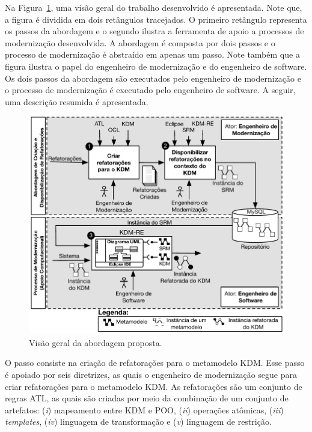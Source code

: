

Na Figura~\ref{fig:abordagem_kdm_tese_processo}, uma visão geral do trabalho desenvolvido é apresentada. Note que, a figura é dividida em dois retângulos tracejados. O primeiro retângulo representa os passos da abordagem e o segundo ilustra a ferramenta de apoio a processos de modernização desenvolvida. A abordagem é composta por dois passos e o processo de modernização é abstraído em apenas um passo. Note também que a figura ilustra o papel do engenheiro de modernização e do engenheiro de software. 
Os dois passos da abordagem são executados pelo engenheiro de modernização e o processo de modernização é executado pelo engenheiro de software. A seguir, uma descrição resumida é apresentada.

\begin{figure}[h]
	\centering
	\caption{Visão geral da abordagem proposta.}
	\label{fig:abordagem_kdm_tese_processo}
	\includegraphics[scale=0.8]{images/NovaFiguraSintexeAbordagem}
	\fautor
\end{figure}


O passo  consiste na criação de refatorações para o metamodelo KDM. Esse passo é apoiado por seis diretrizes, as quais o engenheiro de modernização segue para criar refatorações para o metamodelo KDM. As refatorações são um conjunto de regras ATL, as quais são criadas por meio da combinação de um conjunto de artefatos: (\textit{i}) mapeamento entre KDM e POO, (\textit{ii}) operações atômicas, (\textit{iii}) \textit{templates}, (\textit{iv}) linguagem de transformação e (\textit{v}) linguagem de restrição.


